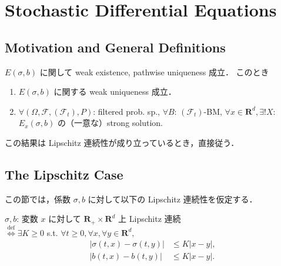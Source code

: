 \documentclass{jsarticle}
\title{}
\author{}
\date{
}
\begin{document}
\setcounter{section}{7}
\section{Stochastic Differential Equations}
\subsection{Motivation and General Definitions}

\begin{screen}
    \begin{thm*}
        $E(\sigma, b)$ に関して weak existence, pathwise uniqueness 成立．
        このとき
        \begin{enumerate}[label=(\roman*)]
            \item
            $E(\sigma, b)$ に関する weak uniqueness 成立．
            \item
            $\forall (\Omega, \mathcal{F}, (\mathcal{F}_t), P)$: filtered prob. sp., $\forall B$: $(\mathcal{F}_t)$-BM, $\forall x\in\mathbf{R}^d, \exists! X$: $E_x(\sigma, b)$ の（一意な）strong solution.
        \end{enumerate}
    \end{thm*}
\end{screen}

この結果は Lipschitz 連続性が成り立っているとき，直接従う．

\subsection{The Lipschitz Case}

この節では，係数 $\sigma, b$ に対して以下の Lipschitz 連続性を仮定する．

\begin{screen}
    \begin{df*}
        $\sigma, b$: 変数 $x$ に対して $\mathbf{R_+}\times\mathbf{R}^d$ 上 Lipschitz 連続 \\
        $\stackrel{\operatorname{def}}{\iff}\exists K\ge0$ s.t. $\forall t\ge0, \forall x, \forall y\in\mathbf{R}^d,$
        \begin{align}
            \left\lvert\sigma(t, x)-\sigma(t, y)\right\rvert
            &\le K\left\lvert x-y\right\rvert, \\
            \left\lvert b(t, x)-b(t, y)\right\rvert
            &\le K\left\lvert x-y\right\rvert.
        \end{align}
    \end{df*}
\end{screen}
\end{document}
